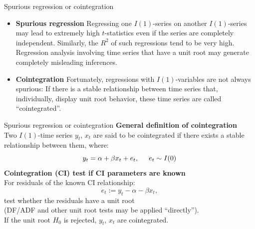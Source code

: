 \documentclass{beamer}
\begin{document}
\begin{frame}{Spurious regression or cointegration}
\begin{itemize}
\item \textbf{Spurious regression}
 Regressing one $I(1)$-series on another $I(1)$-series may lead to extremely
high $t$-statistics even if the series are completely independent. Similarly, the $R^2$ of such regressions tend to be very high. \\Regression analysis involving time series that have a unit root may generate completely misleading inferences.
\vspace{0.5cm}
\item \textbf{Cointegration} Fortunately, regressions with $I(1)$-variables are not always spurious:
If there is a stable relationship between time series that, individually, display unit root behavior, these time series are called ``cointegrated''.
\end{itemize}
\end{frame}
\begin{frame}{Spurious regression or cointegration}
\textbf{General definition of cointegration}\\
\vspace{0.5cm}
Two $I(1)$-time series $y_t$, $x_t$ are said to be cointegrated if there exists a stable relationship between them, where:
$$ y_t=\alpha+\beta x_t + e_t, 
\hspace{0.5cm} e_t \sim I(0)$$
\textbf{Cointegration (CI) test if CI parameters are known}\\
\vspace{0.5cm}
For residuals of the known CI relationship:
$$e_t := y_t-\alpha-\beta x_t, $$
test whether the residuals have a unit root \\(DF/ADF and other unit root tests may be applied ``directly''). \\ \medskip If the unit root $H_0$ is rejected, $y_t$, $x_t$ are cointegrated. 
\end{frame}
\end{document}
